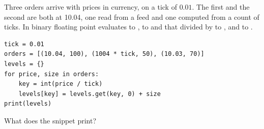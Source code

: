 \begin{question}
\label{question.floatPricesSplitALevel}
Three orders arrive with prices in currency, on a tick of $0.01$.
The first and the second are both at 10.04,
one read from a feed and one computed from a count of ticks.
In binary floating point
 evaluates to ,
 to 
and that divided by  to ,
and  to .
\begin{lstlisting}[caption={Sizes keyed by price in ticks}, label=listing.floatPrices]
tick = 0.01
orders = [(10.04, 100), (1004 * tick, 50), (10.03, 70)]
levels = {}
for price, size in orders:
    key = int(price / tick)
    levels[key] = levels.get(key, 0) + size
print(levels)
\end{lstlisting}
What does the snippet print?
\begin{choices}
 \choice {}
 \correctchoice {}
 \choice {}
 \choice {}
\end{choices}
\end{question}

